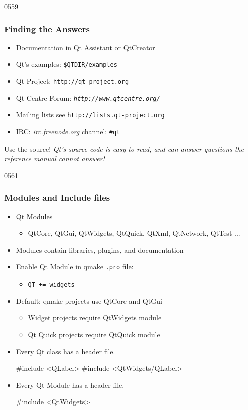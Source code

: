 \begin{slide}[fragile]{0559}
  \frametitle{Finding the Answers}\label{findingTheAnswer}
  \begin{itemize}
  \item Documentation in Qt Assistant or QtCreator
  \item Qt's examples:  \texttt{\$QTDIR/examples}
    \item Qt Project: \texttt{http://qt-project.org}
 \item Qt Centre Forum: \textit{\texttt{http://www.qtcentre.org/}}
  \item Mailing lists see \texttt{http://lists.qt-project.org}
  \item IRC: \textit{irc.freenode.org} channel: \texttt{\#qt}
  \end{itemize}
   \begin{block}{Use the source!}
    \textit{Qt's source code is easy to read, and can answer
      questions the reference manual cannot answer!} 
   \end{block}
\end{slide}
\begin{slide}[fragile]{0561}
  \frametitle{Modules and Include files}
  \begin{itemize}
  \item Qt Modules
    \begin{itemize}
    \item  QtCore, QtGui, QtWidgets, QtQuick, QtXml, QtNetwork, QtTest ...
    \end{itemize}
  \item Modules contain libraries, plugins, and documentation
  \item Enable Qt Module in qmake \texttt{.pro} file: 
    \begin{itemize}
    \item  \verb!QT += widgets!
    \end{itemize}
  \item Default: qmake projects use QtCore and QtGui
    \begin{itemize}
    \item Widget projects require QtWidgets module
    \item Qt Quick projects require QtQuick module
    \end{itemize}
  \item Every Qt class has a header file.
  \begin{cpp}
#include <QLabel>
#include <QtWidgets/QLabel>
  \end{cpp}
    \item Every Qt Module has a header file.
  \begin{cpp}
#include <QtWidgets>
  \end{cpp}
  \end{itemize}
\end{slide}

